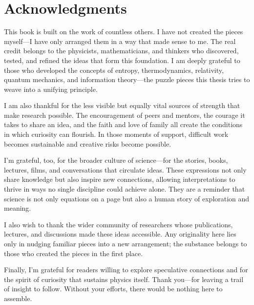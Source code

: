 \section*{Acknowledgments}
This book is built on the work of countless others. I have not created the pieces myself—I have only arranged them in a way that made sense to me. The real credit belongs to the physicists, mathematicians, and thinkers who discovered, tested, and refined the ideas that form this foundation. I am deeply grateful to those who developed the concepts of entropy, thermodynamics, relativity, quantum mechanics, and information theory—the puzzle pieces this thesis tries to weave into a unifying principle.

I am also thankful for the less visible but equally vital sources of strength that make research possible. The encouragement of peers and mentors, the courage it takes to share an idea, and the faith and love of family all create the conditions in which curiosity can flourish. In those moments of support, difficult work becomes sustainable and creative risks become possible.

I’m grateful, too, for the broader culture of science—for the stories, books, lectures, films, and conversations that circulate ideas. These expressions not only share knowledge but also inspire new connections, allowing interpretations to thrive in ways no single discipline could achieve alone. They are a reminder that science is not only equations on a page but also a human story of exploration and meaning.

I also wish to thank the wider community of researchers whose publications, lectures, and discussions made these ideas accessible. Any originality here lies only in nudging familiar pieces into a new arrangement; the substance belongs to those who created the pieces in the first place.

Finally, I’m grateful for readers willing to explore speculative connections and for the spirit of curiosity that sustains physics itself. Thank you—for leaving a trail of insight to follow. Without your efforts, there would be nothing here to assemble.